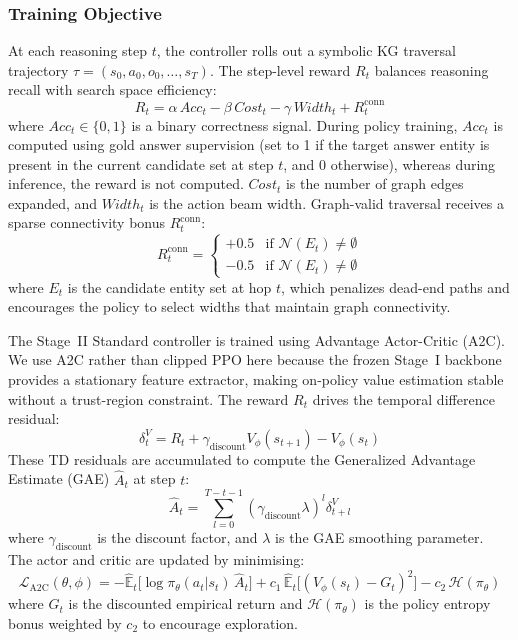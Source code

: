 \documentclass[10pt,conference]{IEEEtran}
\begin{document}
\subsubsection{Training Objective}
\label{sec:stage2_training}

At each reasoning step $t$, the controller rolls out a symbolic KG traversal trajectory $\tau = (s_0, a_0, o_0, \dots, s_T)$. The step-level reward $R_t$ balances reasoning recall with search space efficiency:
\begin{equation}
R_t = \alpha\, Acc_t - \beta\, Cost_t - \gamma\, Width_t + R^{\text{conn}}_t
\end{equation}
where $Acc_t \in \{0,1\}$ is a binary correctness signal. During policy training, $Acc_t$ is computed using gold answer supervision (set to 1 if the target answer entity is present in the current candidate set at step $t$, and 0 otherwise), whereas during inference, the reward is not computed. $Cost_t$ is the number of graph edges expanded, and $Width_t$ is the action beam width. Graph-valid traversal receives a sparse connectivity bonus $R^{\text{conn}}_t$:
\begin{equation}
R^{\text{conn}}_t = \begin{cases}
+0.5 & \text{if } \mathcal{N}(E_t) \neq \emptyset \\
-0.5 & \text{if } \mathcal{N}(E_t) \neq \emptyset
\end{cases}
\end{equation}
where $E_t$ is the candidate entity set at hop $t$, which penalizes dead-end paths and encourages the policy to select widths that maintain graph connectivity.

The Stage~II Standard controller is trained using Advantage Actor-Critic (A2C). We use A2C rather than clipped PPO here because the frozen Stage~I backbone provides a stationary feature extractor, making on-policy value estimation stable without a trust-region constraint. The reward $R_t$ drives the temporal difference residual:
\begin{equation}
\delta_t^V = R_t + \gamma_{\text{discount}} V_\phi(s_{t+1}) - V_\phi(s_t)
\end{equation}
These TD residuals are accumulated to compute the Generalized Advantage Estimate (GAE) $\hat{A}_t$ at step $t$:
\begin{equation}
\hat{A}_t = \sum_{l=0}^{T-t-1} (\gamma_{\text{discount}} \lambda)^l \delta_{t+l}^V
\end{equation}
where $\gamma_{\text{discount}}$ is the discount factor, and $\lambda$ is the GAE smoothing parameter. The actor and critic are updated by minimising:
\begin{equation}
\mathcal{L}_{\text{A2C}}(\theta,\phi) = -\hat{\mathbb{E}}_t\bigl[\log \pi_\theta(a_t|s_t)\,\hat{A}_t\bigr] + c_1\,\hat{\mathbb{E}}_t\bigl[(V_\phi(s_t) - G_t)^2\bigr] - c_2\,\mathcal{H}(\pi_\theta)
\end{equation}
where $G_t$ is the discounted empirical return and $\mathcal{H}(\pi_\theta)$ is the policy entropy bonus weighted by $c_2$ to encourage exploration.
\end{document}
